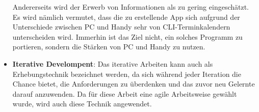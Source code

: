 \begin{itemize}
			Andererseits wird der Erwerb von Informationen als zu gering eingeschätzt. Es wird nämlich vermutet, dass die zu erstellende App sich aufgrund der Unterschiede zwischen PC und Handy sehr von CLI-Terminkalendern unterscheiden wird. Immerhin ist das Ziel nicht, ein solches Programm zu portieren, sondern die Stärken von PC und Handy zu nutzen.%
	\item \textbf{Iterative Develompent}: %
		Das iterative Arbeiten kann auch als Erhebungstechnik bezeichnet werden, da sich während jeder Iteration die Chance bietet, die Anforderungen zu überdenken und das zuvor neu Gelernte darauf anzuwenden. %
		Da für diese Arbeit eine agile Arbeitsweise gewählt wurde, wird auch diese Technik angewendet.%
\end{itemize}


